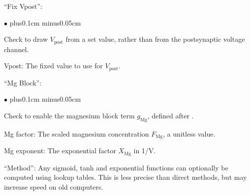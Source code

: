 \documentclass{article}
\newenvironment{myitem}{\begin{list}{$\bullet$}{\setlength{\leftmargin}{1.1em}
\itemsep0.1cm plus0.1cm minus0.05cm
\listparindent0cm
\addtolength{\labelsep}{0.5\labelsep}
\setlength{\labelwidth}{0.8em}
\setlength{\leftmargin}{\labelwidth}
\addtolength{\leftmargin}{\labelsep}
}}{\end{list}}
\begin{document}
``Fix Vpost'':
\begin{myitem}
	\item Check to draw $V_{\text{post}}$ from a set value, rather than from the
	postsynaptic voltage channel.
	\item Vpost: The fixed value to use for $V_{\text{post}}$.
\end{myitem}
``Mg Block'':
\begin{myitem}
	\item Check to enable the magnesium block term $g_{\text{Mg}}$, defined
	after \cite{FellousSejnowski2003}.
	\item Mg factor: The scaled magnesium concentration $F_{\text{Mg}}$, a unitless value.
	\item Mg exponent: The exponential factor $X_{\text{Mg}}$ in 1/V.
\end{myitem}
``Method'': Any sigmoid, tanh and exponential functions can optionally be computed using
lookup tables. This is less precise than direct methods, but may increase speed
on old computers.
\end{document}
